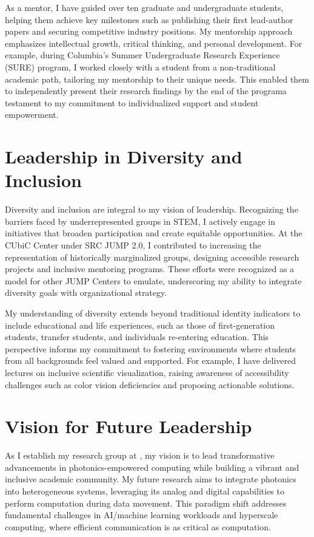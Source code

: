 As a mentor, I have guided over ten graduate and undergraduate students, helping them achieve key milestones such as publishing their first lead-author papers and securing competitive industry positions. My mentorship approach emphasizes intellectual growth, critical thinking, and personal development. For example, during Columbia's Summer Undergraduate Research Experience (SURE) program, I worked closely with a student from a non-traditional academic path, tailoring my mentorship to their unique needs. This enabled them to independently present their research findings by the end of the program\textemdash{}a testament to my commitment to individualized support and student empowerment.

\section*{Leadership in Diversity and Inclusion}

Diversity and inclusion are integral to my vision of leadership. Recognizing the barriers faced by underrepresented groups in STEM, I actively engage in initiatives that broaden participation and create equitable opportunities. At the CUbiC Center under SRC JUMP 2.0, I contributed to increasing the representation of historically marginalized groups, designing accessible research projects and inclusive mentoring programs. These efforts were recognized as a model for other JUMP Centers to emulate, underscoring my ability to integrate diversity goals with organizational strategy.

My understanding of diversity extends beyond traditional identity indicators to include educational and life experiences, such as those of first-generation students, transfer students, and individuals re-entering education. This perspective informs my commitment to fostering environments where students from all backgrounds feel valued and supported. For example, I have delivered lectures on inclusive scientific visualization, raising awareness of accessibility challenges such as color vision deficiencies and proposing actionable solutions.

\section*{Vision for Future Leadership}

As I establish my research group at \appSchoolDeptShort{}, my vision is to lead transformative advancements in photonics-empowered computing while building a vibrant and inclusive academic community. My future research aims to integrate photonics into heterogeneous systems, leveraging its analog and digital capabilities to perform computation during data movement. This paradigm shift addresses fundamental challenges in AI/machine learning workloads and hyperscale computing, where efficient communication is as critical as computation.

